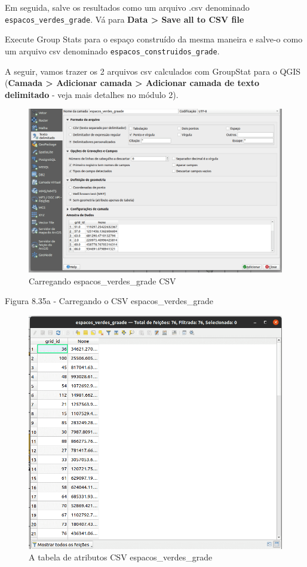 \documentclass[
]{krantz}
\begin{document}
Em seguida, salve os resultados como um arquivo .csv denominado \texttt{espacos\_verdes\_grade}. Vá para \textbf{Data \textgreater{} Save all to CSV file}

Execute Group Stats para o espaço construído da mesma maneira e salve-o como um arquivo csv denominado \texttt{espacos\_construidos\_grade}.

A seguir, vamos trazer os 2 arquivos csv calculados com GroupStat para o QGIS (\textbf{Camada \textgreater{} Adicionar camada \textgreater{} Adicionar camada de texto delimitado} - veja mais detalhes no módulo 2).

\begin{figure}
\centering
\includegraphics{media/modulo8/fig835_a.png}
\caption{Carregando espacos\_verdes\_grade CSV}
\end{figure}

Figura 8.35a - Carregando o CSV espacos\_verdes\_grade

\begin{figure}
\centering
\includegraphics{media/modulo8/fig835_b.png}
\caption{A tabela de atributos CSV espacos\_verdes\_grade}
\end{figure}
\end{document}
